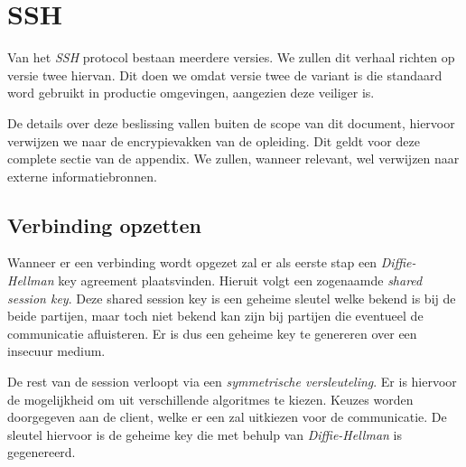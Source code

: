 %
%
%
%

\chapter{SSH}\label{app.ssh}
Van het \emph{SSH} protocol bestaan meerdere versies. We zullen dit verhaal richten op versie twee hiervan. Dit doen we omdat versie twee de variant is die standaard word gebruikt in productie omgevingen, aangezien deze veiliger is. 

De details over deze beslissing vallen buiten de scope van dit document, hiervoor verwijzen we naar de encrypievakken van de opleiding. Dit geldt voor deze complete sectie van de appendix. We zullen, wanneer relevant, wel verwijzen naar externe informatiebronnen. 

\section{Verbinding opzetten}
Wanneer er een verbinding wordt opgezet zal er als eerste stap een \emph{Diffie-Hellman}\cite{bib.diffiehellman}\cite{bib.diffiehellman.paper} key agreement plaatsvinden. Hieruit volgt een zogenaamde \emph{shared session key}. Deze shared session key is een geheime sleutel welke bekend is bij de beide partijen, maar toch niet bekend kan zijn bij partijen die eventueel de communicatie afluisteren. Er is dus een geheime key te genereren over een insecuur medium. 

De rest van de session verloopt via een \emph{symmetrische versleuteling}\cite{bib.sym.enc}. Er is hiervoor de mogelijkheid om uit verschillende algoritmes te kiezen. Keuzes worden doorgegeven aan de client, welke er een zal uitkiezen voor de communicatie. De sleutel hiervoor is de geheime key die met behulp van \emph{Diffie-Hellman} is gegenereerd. 

